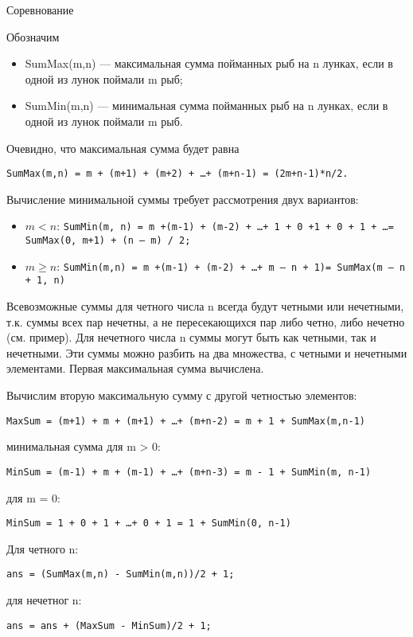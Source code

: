\begin{tutorial}{Соревнование }

Обозначим
\begin{itemize}
\item SumMax(m,n) --- максимальная сумма пойманных рыб на n лунках, если в одной из лунок поймали m рыб;
\item SumMin(m,n) --- минимальная сумма пойманных рыб на n лунках, если в одной из лунок поймали m рыб.
\end{itemize}

Очевидно, что максимальная сумма будет равна

\texttt{SumMax(m,n) = m + (m+1) + (m+2) + \dots + (m+n-1) = (2m+n-1)*n/2.}

Вычисление минимальной суммы требует рассмотрения двух вариантов:
\begin{itemize}
\item  $m < n$: \texttt{SumMin(m, n) = m +(m-1) + (m-2) + \dots + 1 + 0 +1 + 0 + 1 + \dots = SumMax(0, m+1) + (n -- m) / 2;}
\item $m \ge n$: \texttt{SumMin(m,n) = m +(m-1) + (m-2) + \dots + m -- n + 1)= SumMax(m -- n + 1, n)}
\end{itemize}

Всевозможные суммы для четного числа n всегда будут четными или нечетными, т.к. суммы всех пар нечетны, а не пересекающихся пар либо четно, либо нечетно (см. пример). Для нечетного числа n суммы могут быть как четными, так и нечетными. Эти суммы можно разбить на два множества, с четными и нечетными элементами. Первая максимальная сумма вычислена. 

Вычислим вторую максимальную сумму с другой четностью элементов:

\texttt{MaxSum = (m+1) + m + (m+1) + \dots + (m+n-2) = m + 1 + SumMax(m,n-1)}

минимальная сумма для m > 0:

\texttt{MinSum = (m-1) + m + (m-1) + \dots + (m+n-3) = m - 1 + SumMin(m, n-1)}

для m = 0:

\texttt{MinSum = 1 + 0 + 1 + \dots + 0 + 1 = 1 + SumMin(0, n-1)}

Для четного n:

\texttt{ans = (SumMax(m,n) - SumMin(m,n))/2 + 1;}

для нечетног n:

\texttt{ans = ans + (MaxSum - MinSum)/2 + 1;}

\end{tutorial}
